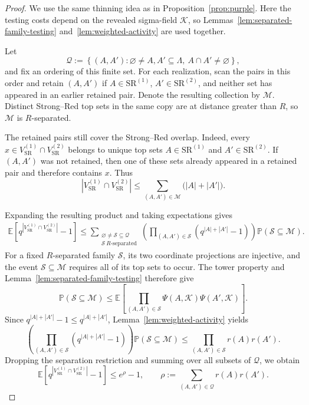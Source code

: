 \documentclass[letterpaper,11pt,reqno]{amsart}
\theoremstyle{definition}
\begin{document}
\begin{proof}
We use the same thinning idea as in Proposition~\ref{prop:purple}. Here the
testing costs depend on the revealed sigma-field \(\mathcal K\), so
Lemmas~\ref{lem:separated-family-testing} and~\ref{lem:weighted-activity}
are used together.

Let
\[
\mathcal Q:=
\left\{
(A,A'):\varnothing\ne A,A'\subseteq\Lambda,\ A\cap A'\ne\varnothing
\right\},
\]
and fix an ordering of this finite set. For each realization, scan the pairs
in this order and retain \((A,A')\) if
\(A\in\mathrm{SR}^{(1)}\), \(A'\in\mathrm{SR}^{(2)}\), and neither set has
appeared in an earlier retained pair. Denote the resulting collection by
\(\mathcal M\). Distinct Strong--Red top sets in the same copy are at
distance greater than \(R\), so \(\mathcal M\) is \(R\)-separated.

The retained pairs still cover the Strong--Red overlap. Indeed, every
\(x\in V_{\mathrm{SR}}^{(1)}\cap V_{\mathrm{SR}}^{(2)}\) belongs to unique
top sets \(A\in\mathrm{SR}^{(1)}\) and \(A'\in\mathrm{SR}^{(2)}\). If
\((A,A')\) was not retained, then one of these sets already appeared in a
retained pair and therefore contains \(x\). Thus
\[
\left|V_{\mathrm{SR}}^{(1)}\cap V_{\mathrm{SR}}^{(2)}\right|
\le
\sum_{(A,A')\in\mathcal M}\bigl(|A|+|A'|\bigr).
\]


Expanding the resulting product and taking expectations gives
\[
\begin{aligned}
\mathbb E\left[
q^{|V_{\mathrm{SR}}^{(1)}\cap V_{\mathrm{SR}}^{(2)}|}-1
\right]
\le
\sum_{\substack{\varnothing\ne\mathcal S\subseteq\mathcal Q\\
                 \mathcal S\ R\text{-separated}}}
\left(
\prod_{(A,A')\in\mathcal S}\left(q^{|A|+|A'|}-1\right)
\right)
\mathbb P(\mathcal S\subseteq\mathcal M).
\end{aligned}
\]
For a fixed \(R\)-separated family \(\mathcal S\), its two coordinate
projections are injective, and the event \(\mathcal S\subseteq\mathcal M\)
requires all of its top sets to occur. The tower property and
Lemma~\ref{lem:separated-family-testing} therefore give
\[
\mathbb P(\mathcal S\subseteq\mathcal M)
\le
\mathbb E\left[
\prod_{(A,A')\in\mathcal S}
\Psi (A,\mathcal K)\Psi (A',\mathcal K)
\right].
\]
Since \(q^{|A|+|A'|}-1\le q^{|A|+|A'|}\),
Lemma~\ref{lem:weighted-activity} yields
\[
\left(
\prod_{(A,A')\in\mathcal S}\left(q^{|A|+|A'|}-1\right)
\right)
\mathbb P(\mathcal S\subseteq\mathcal M)
\le
\prod_{(A,A')\in\mathcal S}r(A)r(A').
\]
Dropping the separation restriction and summing over all subsets of
\(\mathcal Q\), we obtain
\[
\mathbb E\left[
q^{|V_{\mathrm{SR}}^{(1)}\cap V_{\mathrm{SR}}^{(2)}|}-1
\right]
\le e^\rho-1,
\qquad
\rho:=
\sum_{(A,A')\in\mathcal Q}r(A)r(A').
\]


\end{proof}
\end{document}
